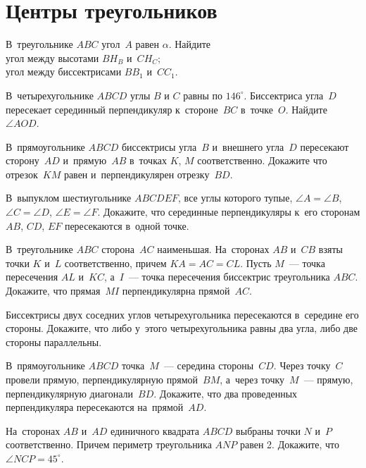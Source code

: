 
\section*{Центры треугольников}


\begin{problems}

\item
В~треугольнике $ABC$ угол~$A$ равен $\alpha$.
Найдите
\\
\subproblem угол между высотами $B H_B$ и~$C H_C$;
\\
\subproblem угол между биссектрисами $B B_1$ и~$C C_1$.

\item
В~четырехугольнике $ABCD$ углы $B$ и $C$ равны по $146^{\circ}$.
Биссектриса угла~$D$ пересекает серединный перпендикуляр к~стороне~$BC$
в~точке~$O$.
Найдите $\angle AOD$.

\item
В~прямоугольнике $ABCD$ биссектрисы угла~$B$ и~внешнего угла~$D$ пересекают
сторону~$AD$ и~прямую~$AB$ в~точках $K$, $M$ соответственно.
Докажите что отрезок~$KM$ равен и~перпендикулярен отрезку~$BD$.

\item
В~выпуклом шестиугольнике $ABCDEF$, все углы которого тупые,
$\angle A = \angle B$, $\angle C = \angle D$, $\angle E = \angle F$.
Докажите, что серединные перпендикуляры к~его сторонам $AB$, $CD$, $EF$
пересекаются в~одной точке.

\item
В~треугольнике $ABC$ сторона~$AC$ наименьшая.
На~сторонах $AB$ и~$CB$ взяты точки $K$ и~$L$ соответственно, причем
$KA = AC = CL$.
Пусть $M$~--- точка пересечения $AL$ и~$KC$, а~$I$~--- точка пересечения
биссектрис треугольника $ABC$.
Докажите, что прямая~$MI$ перпендикулярна прямой~$AC$.

\item
Биссектрисы двух соседних углов четырехугольника пересекаются в~середине его
стороны.
Докажите, что либо у~этого четырехугольника равны два угла, либо две стороны
параллельны.

\item
В~прямоугольнике $ABCD$ точка~$M$~--- середина стороны~$CD$.
Через точку~$C$ провели прямую, перпендикулярную прямой~$BM$, а~через
точку~$M$~--- прямую, перпендикулярную диагонали~$BD$.
Докажите, что два проведенных перпендикуляра пересекаются на~прямой~$AD$.

\item
На~сторонах $AB$ и~$AD$ единичного квадрата $ABCD$ выбраны точки $N$ и~$P$
соответственно.
Причем периметр треугольника $ANP$ равен 2.
Докажите, что $\angle NCP = 45^{\circ}$.


\end{problems}

